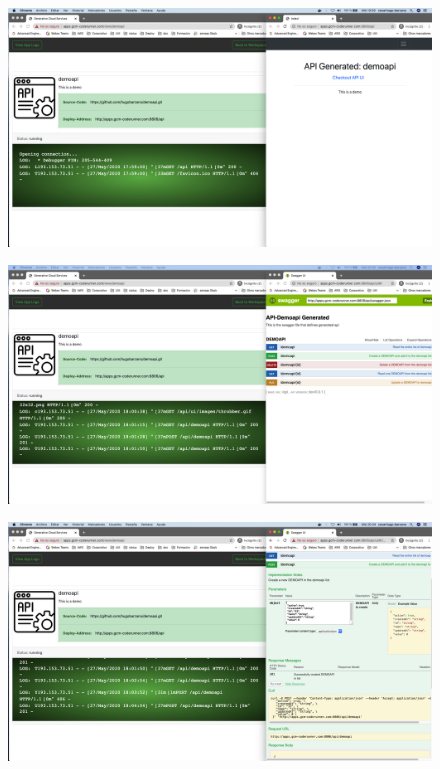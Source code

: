 \documentclass[a4paper,11pt]{book}
\begin{document}
\begin{figure}[H]
\centering
\includegraphics[scale=0.2]{imagenes/casouso/1_7.png}
\caption{   }
\end{figure}


\begin{figure}[H]
\centering
\includegraphics[scale=0.2]{imagenes/casouso/1_8.png}
\caption{   }
\end{figure}


\begin{figure}[H]
\centering
\includegraphics[scale=0.2]{imagenes/casouso/1_10.png}
\caption{   }
\end{figure}
\end{document}
